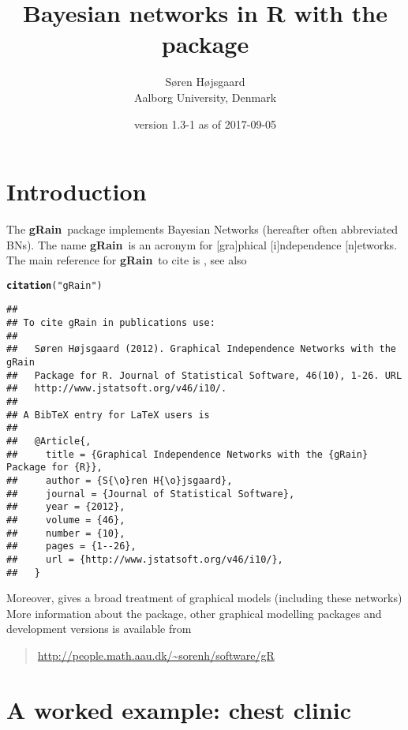 \documentclass[10pt]{article}\usepackage[]{graphicx}\usepackage[]{color}
\author{S{\o}ren H{\o}jsgaard\\Aalborg University, Denmark}
\title{Bayesian networks in R with the \pkg{gRain} package}
\date{\pkg{gRain} version 1.3-1 as of 2017-09-05}
\makeatletter
\newcommand{\hlstr}[1]{\textcolor[rgb]{0.192,0.494,0.8}{#1}}%
\newcommand{\hlstd}[1]{\textcolor[rgb]{0.345,0.345,0.345}{#1}}%
\newcommand{\hlkwd}[1]{\textcolor[rgb]{0.737,0.353,0.396}{\textbf{#1}}}%
\newenvironment{kframe}{%
 \def\at@end@of@kframe{}%
 \ifinner\ifhmode%
  \def\at@end@of@kframe{\end{minipage}}%
  \begin{minipage}{\columnwidth}%
 \fi\fi%
 \def\FrameCommand##1{\hskip\@totalleftmargin \hskip-\fboxsep
 \colorbox{shadecolor}{##1}\hskip-\fboxsep
     \hskip-\linewidth \hskip-\@totalleftmargin \hskip\columnwidth}%
 \MakeFramed {\advance\hsize-\width
   \@totalleftmargin\z@ \linewidth\hsize
   \@setminipage}}%
 {\par\unskip\endMakeFramed%
 \at@end@of@kframe}
\newenvironment{knitrout}{}{} %
\def\grbn{{\bf gRain}}
\makeatother
\begin{document}
\maketitle
\tableofcontents
\parindent0pt\parskip5pt

\section{Introduction}

The \grbn\ package implements Bayesian Networks (hereafter often
abbreviated BNs). The name \grbn\ is an acronym for [gra]phical
[i]ndependence [n]etworks. The main reference for \grbn\ to cite is
\cite{hoj:12}, see also

\begin{knitrout}
\color{fgcolor}\begin{kframe}
\begin{alltt}
\hlkwd{citation}\hlstd{(}\hlstr{"gRain"}\hlstd{)}
\end{alltt}
\begin{verbatim}
## 
## To cite gRain in publications use:
## 
##   Søren Højsgaard (2012). Graphical Independence Networks with the gRain
##   Package for R. Journal of Statistical Software, 46(10), 1-26. URL
##   http://www.jstatsoft.org/v46/i10/.
## 
## A BibTeX entry for LaTeX users is
## 
##   @Article{,
##     title = {Graphical Independence Networks with the {gRain} Package for {R}},
##     author = {S{\o}ren H{\o}jsgaard},
##     journal = {Journal of Statistical Software},
##     year = {2012},
##     volume = {46},
##     number = {10},
##     pages = {1--26},
##     url = {http://www.jstatsoft.org/v46/i10/},
##   }
\end{verbatim}
\end{kframe}
\end{knitrout}

Moreover, \cite{hoj:edw:lau:12} gives a broad treatment of graphical models (including these networks)
More information about the package, other graphical modelling packages
and development versions is available from
\begin{quote}
\url{http://people.math.aau.dk/~sorenh/software/gR}
\end{quote}


\section{A worked example: chest clinic}
\label{sec:chest}
\end{document}
